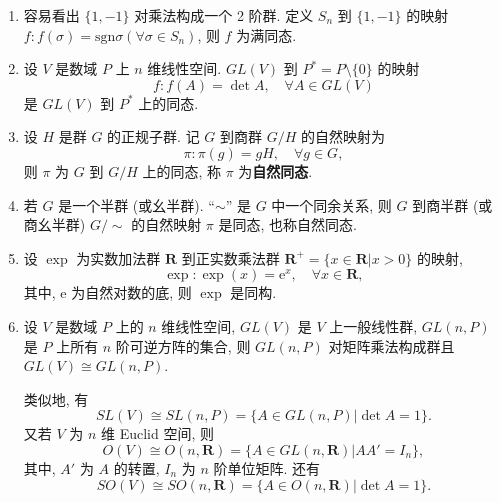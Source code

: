 \documentclass[../../main.tex]{subfiles}
\begin{document}
\begin{example}
\begin{enumerate}
\item 容易看出 \( \{1,-1\} \) 对乘法构成一个 2 阶群. 定义 \( S_n \) 到 \( \{1,-1\} \) 的映射 \( f: f(\sigma) = \text{sgn}\sigma (\forall \sigma \in S_n) \), 则 \( f \) 为满同态.

\item 设 \( V \) 是数域 \( P \) 上 \( n \) 维线性空间. \( GL(V) \) 到 \( P^* = P \setminus \{0\} \) 的映射
\[
f: f(A) = \det A, \quad \forall A \in GL(V)
\]
是 \( GL(V) \) 到 \( P^* \) 上的同态.

\item 设 \( H \) 是群 \( G \) 的正规子群. 记 \( G \) 到商群 \( G/H \) 的自然映射为
\[
\pi: \pi(g) = gH, \quad \forall g \in G,
\]
则 \( \pi \) 为 \( G \) 到 \( G/H \) 上的同态, 称 \( \pi \) 为\textbf{自然同态}.

\item 若 \( G \) 是一个半群 (或幺半群). “\(\sim\)” 是 \( G \) 中一个同余关系, 则 \( G \) 到商半群 (或商幺半群) \( G/\sim \) 的自然映射 \( \pi \) 是同态, 也称自然同态.

\item 设 \( \exp \) 为实数加法群 \( \mathbf{R} \) 到正实数乘法群 \( \mathbf{R}^+ = \{x \in \mathbf{R}|x > 0\} \) 的映射,
\[
\exp: \exp(x) = \text{e}^x, \quad \forall x \in \mathbf{R},
\]
其中, \( \text{e} \) 为自然对数的底, 则 \( \exp \) 是同构.

\item 设 \( V \) 是数域 \( P \) 上的 \( n \) 维线性空间, \( GL(V) \) 是 \( V \) 上一般线性群, \( GL(n,P) \) 是 \( P \) 上所有 \( n \) 阶可逆方阵的集合, 则 \( GL(n,P) \) 对矩阵乘法构成群且 \( GL(V) \cong GL(n,P) \).

类似地, 有
\[
SL(V) \cong SL(n,P) = \{A \in GL(n,P)|\det A = 1\}.
\]
又若 \( V \) 为 \( n \) 维 Euclid 空间, 则
\[
O(V) \cong O(n,\mathbf{R}) = \{A \in GL(n,\mathbf{R})|AA' = I_n\},
\]
其中, \( A' \) 为 \( A \) 的转置, \( I_n \) 为 \( n \) 阶单位矩阵. 还有
\[
SO(V) \cong SO(n,\mathbf{R}) = \{A \in O(n,\mathbf{R})|\det A = 1\}.
\]
\end{enumerate}
\end{example}
\end{document}

